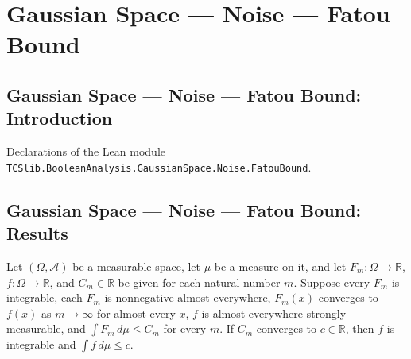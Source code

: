 \section{Gaussian Space --- Noise --- Fatou Bound}
\subsection*{Gaussian Space --- Noise --- Fatou Bound: Introduction}

Declarations of the Lean module \texttt{TCSlib.BooleanAnalysis.GaussianSpace.Noise.FatouBound}.

\subsection*{Gaussian Space --- Noise --- Fatou Bound: Results}

\begin{lemma}
\label{BooleanAnalysis.GaussianSpace.integrable_and_integral_le_of_nonneg_tendsto}
\leanok
{}
Let $(\Omega,\mathcal A)$ be a measurable space, let $\mu$ be a measure on it, and let
$F_m:\Omega\to\mathbb R$, $f:\Omega\to\mathbb R$, and $C_m\in\mathbb R$ be given for
each natural number $m$. Suppose every $F_m$ is integrable, each $F_m$ is nonnegative
almost everywhere, $F_m(x)$ converges to $f(x)$ as $m\to\infty$ for almost every $x$,
$f$ is almost everywhere strongly measurable, and $\int F_m\,d\mu\le C_m$ for every $m$.
If $C_m$ converges to $c\in\mathbb R$, then $f$ is integrable and $\int f\,d\mu\le c$.
\end{lemma}
